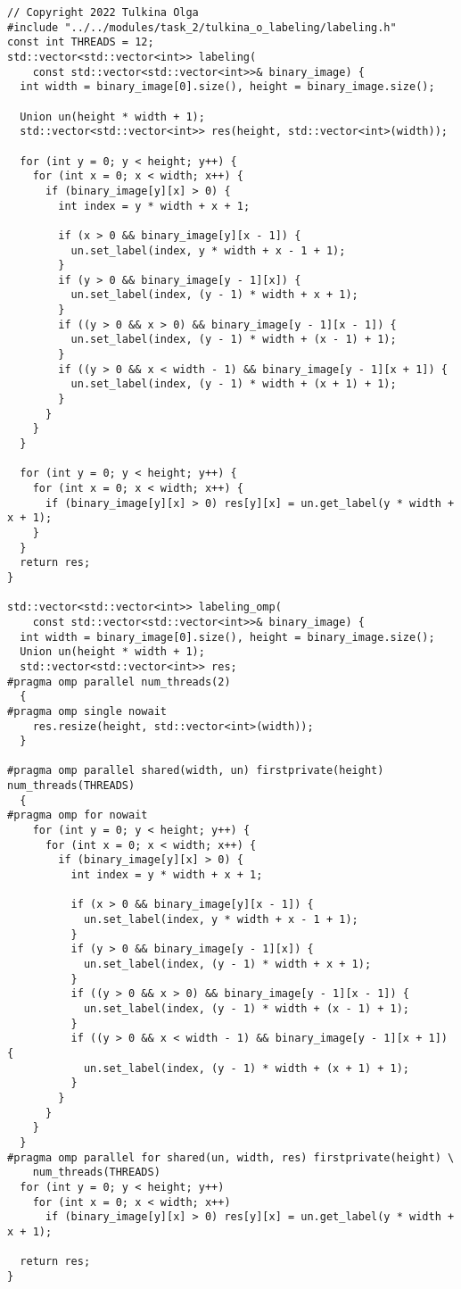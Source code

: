\documentclass[12pt]{article}
\begin{document}
\begin{lstlisting}
// Copyright 2022 Tulkina Olga
#include "../../modules/task_2/tulkina_o_labeling/labeling.h"
const int THREADS = 12;
std::vector<std::vector<int>> labeling(
    const std::vector<std::vector<int>>& binary_image) {
  int width = binary_image[0].size(), height = binary_image.size();

  Union un(height * width + 1);
  std::vector<std::vector<int>> res(height, std::vector<int>(width));

  for (int y = 0; y < height; y++) {
    for (int x = 0; x < width; x++) {
      if (binary_image[y][x] > 0) {
        int index = y * width + x + 1;

        if (x > 0 && binary_image[y][x - 1]) {
          un.set_label(index, y * width + x - 1 + 1);
        }
        if (y > 0 && binary_image[y - 1][x]) {
          un.set_label(index, (y - 1) * width + x + 1);
        }
        if ((y > 0 && x > 0) && binary_image[y - 1][x - 1]) {
          un.set_label(index, (y - 1) * width + (x - 1) + 1);
        }
        if ((y > 0 && x < width - 1) && binary_image[y - 1][x + 1]) {
          un.set_label(index, (y - 1) * width + (x + 1) + 1);
        }
      }
    }
  }

  for (int y = 0; y < height; y++) {
    for (int x = 0; x < width; x++) {
      if (binary_image[y][x] > 0) res[y][x] = un.get_label(y * width + x + 1);
    }
  }
  return res;
}

std::vector<std::vector<int>> labeling_omp(
    const std::vector<std::vector<int>>& binary_image) {
  int width = binary_image[0].size(), height = binary_image.size();
  Union un(height * width + 1);
  std::vector<std::vector<int>> res;
#pragma omp parallel num_threads(2)
  {
#pragma omp single nowait
    res.resize(height, std::vector<int>(width));
  }

#pragma omp parallel shared(width, un) firstprivate(height) num_threads(THREADS)
  {
#pragma omp for nowait
    for (int y = 0; y < height; y++) {
      for (int x = 0; x < width; x++) {
        if (binary_image[y][x] > 0) {
          int index = y * width + x + 1;

          if (x > 0 && binary_image[y][x - 1]) {
            un.set_label(index, y * width + x - 1 + 1);
          }
          if (y > 0 && binary_image[y - 1][x]) {
            un.set_label(index, (y - 1) * width + x + 1);
          }
          if ((y > 0 && x > 0) && binary_image[y - 1][x - 1]) {
            un.set_label(index, (y - 1) * width + (x - 1) + 1);
          }
          if ((y > 0 && x < width - 1) && binary_image[y - 1][x + 1]) {
            un.set_label(index, (y - 1) * width + (x + 1) + 1);
          }
        }
      }
    }
  }
#pragma omp parallel for shared(un, width, res) firstprivate(height) \
    num_threads(THREADS)
  for (int y = 0; y < height; y++)
    for (int x = 0; x < width; x++)
      if (binary_image[y][x] > 0) res[y][x] = un.get_label(y * width + x + 1);

  return res;
}
\end{lstlisting}
\end{document}

